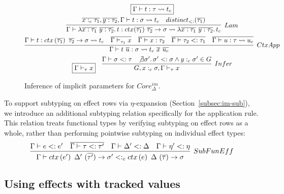 \documentclass[acmsmall,review,screen]{acmart}
\newcommand{\mathframebox}[1]{\framebox{$\displaystyle #1$}}
\newcommand{\ap}{~}
\newcommand{\ctx}[1]{ctx\left(#1\right)~}
\newcommand{\step}{\rightsquigarrow}
\begin{document}
\begin{figure}
    \begin{gather*}
        \mathframebox{\Gamma\vdash t : \tau \step t_{c}} \\
        \infer[Lam]{
            \Gamma\vdash \lambda \overline{x : \tau_1} ~ \overline{y : \tau_2} \ldotp t : ctx(\overline{\tau_1}) ~ \overline{\tau_2} \to \sigma \step \lambda \overline{x : \tau_1} ~ \overline{y : \tau_2} \ldotp t_c
        }{
            \overline{x :_c \tau_1}, \overline{y : \tau_2}, \Gamma\vdash t : \sigma \step t_c &
            distinct_{<:}(\overline{\tau_1})
        } \\
        \infer[CtxApp]{
            \Gamma\vdash t\ap\overline{u} : \sigma \step t_{c} \ap \overline{x}\ap\overline{u_{c}}
        }{
            \Gamma\vdash t : \ctx{\overline{\tau_1}} \overline{\tau_2} \to \sigma \step t_{c} &
            \overline{\Gamma\vdash_{\tau_1} x} &
            \overline{\Gamma\vdash x : \tau_2} &
            \overline{\Gamma\vdash \tau_2 <: \tau_1} &
            \overline{\Gamma\vdash u : \tau \step u_{c}}
        } \\
        \begin{array}{cc}
            \mathframebox{\Gamma\vdash_\tau x} &
            \infer[Infer]{
                G, x :_c \sigma, \Gamma\vdash_{\tau} x
            }{
                \Gamma\vdash\sigma <: \tau &
                \not\exists \sigma'\ldotp \sigma' <: \sigma \land y :_c \sigma' \in G
            }
        \end{array}
    \end{gather*}
    \caption{Inference of implicit parameters for $Core_\Delta^{im}$.}
    \label{fig:core-im-delta-core-implicit-inference}
\end{figure}

To support subtyping on effect rows via $\eta$-expansion (Section~\ref{subsec:im-sub}), we introduce an additional subtyping relation specifically for the application rule.
This relation treats functional types by verifying subtyping on effect rows as a whole, rather than performing pointwise subtyping on individual effect types:
\[
    \infer[SubFunEff]{
        \Gamma\vdash \ctx{e'} \Delta' ~ (\overline{\tau'})\to \sigma' <:_c \ctx{e} \Delta ~ (\overline{\tau})\to \sigma
    }{
        \Gamma\vdash e <: e' & \overline{\Gamma\vdash \tau <: \tau'} & \Gamma\vdash\Delta' <: \Delta & \Gamma\vdash \eta' <: \eta
    }
\]

\subsection{Using effects with tracked values} \label{subsec:relax-tracked}
\end{document}
